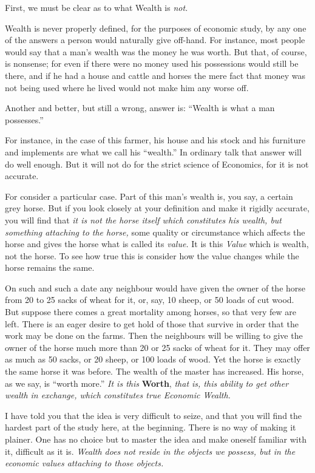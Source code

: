 \documentclass{book}
\begin{document}
First, we must be clear as to what Wealth is \emph{not.}

Wealth is never properly defined, for the purposes of economic study, by any one of the answers a person would naturally give off-hand. For instance, most people would say that a man’s wealth was the money he was worth. But that, of course, is nonsense; for even if there were no money used his possessions would still be there, and if he had a house and cattle and horses the mere fact that money was not being used where he lived would not make him any worse off.

Another and better, but still a wrong, answer is: “Wealth is what a man possesses.”

For instance, in the case of this farmer, his house and his stock and his furniture and implements are what we call his “wealth.” In ordinary talk that answer will do well enough. But it will not do for the strict science of Economics, for it is not accurate.

For consider a particular case. Part of this man’s wealth is, you say, a certain grey horse. But if you look closely at your definition and make it rigidly accurate, you will find that \emph{it is not the horse itself which constitutes his wealth, but something attaching to the horse,} some quality or circumstance which affects the horse and gives the horse what is called its \emph{value.} It is this \emph{Value} which is wealth, not the horse. To see how true this is consider how the value changes while the horse remains the same.

On such and such a date any neighbour would have given the owner of the horse from 20 to 25 sacks of wheat for it, or, say, 10 sheep, or 50 loads of cut wood. But suppose there comes a great mortality among horses, so that very few are left. There is an eager desire to get hold of those that survive in order that the work may be done on the farms. Then the neighbours will be willing to give the owner of the horse much more than 20 or 25 sacks of wheat for it. They may offer as much as 50 sacks, or 20 sheep, or 100 loads of wood. Yet the horse is exactly the same horse it was before. The wealth of the master has increased. His horse, as we say, is “worth more.” \emph{It is this} \textbf{Worth}, \emph{that is, this ability to get other wealth in exchange, which constitutes true Economic Wealth.}

I have told you that the idea is very difficult to seize, and that you will find the hardest part of the study here, at the beginning. There is no way of making it plainer. One has no choice but to master the idea and make oneself familiar with it, difficult as it is. \emph{Wealth does not reside in the objects we possess, but in the economic values attaching to those objects.}
\end{document}
